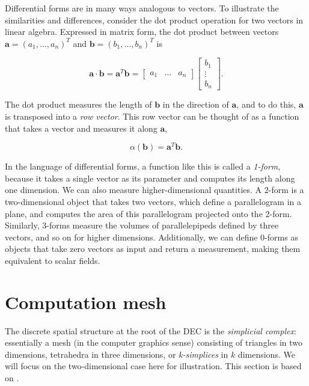\documentclass[utf8,english]{gradu3}
\begin{document}
Differential forms are in many ways analogous to vectors.
To illustrate the similarities and differences,
consider the dot product operation
for two vectors in linear algebra.
Expressed in matrix form, the dot product between vectors
$\mathbf{a} = (a_1, \dots, a_n)^T$ and $\mathbf{b} = (b_1, \dots, b_n)^T$
is

\[
  \mathbf{a} \cdot \mathbf{b} = \mathbf{a}^T \mathbf{b}
  = \begin{bmatrix}
    a_1 & \dots & a_n
  \end{bmatrix}
  \begin{bmatrix}
    b_1 \\ \vdots \\ b_n
  \end{bmatrix}.
\]

The dot product measures the length of $\mathbf{b}$ in the direction of $\mathbf{a}$,
and to do this, $\mathbf{a}$ is transposed into a \textit{row vector}.
This row vector can be thought of as a function
that takes a vector and measures it along $\mathbf{a}$,

\[
  \alpha(\mathbf{b}) = \mathbf{a}^T \mathbf{b}.
\]

In the language of differential forms,
a function like this is called a \textit{1-form},
because it takes a single vector as its parameter
and computes its length along one dimension.
We can also measure higher-dimensional quantities.
A 2-form is a two-dimensional object that takes two vectors,
which define a parallelogram in a plane,
and computes the area of this parallelogram
projected onto the 2-form.
Similarly, 3-forms measure the volumes of parallelepipeds
defined by three vectors, and so on for higher dimensions.
Additionally, we can define 0-forms
as objects that take zero vectors as input and return a measurement,
making them equivalent to scalar fields.


\section{Computation mesh}

The discrete spatial structure at the root of the DEC is the \textit{simplicial complex}:
essentially a mesh (in the computer graphics sense)
consisting of triangles in two dimensions,
tetrahedra in three dimensions, or \textit{k-simplices} in $k$ dimensions.
We will focus on the two-dimensional case here for illustration.
This section is based on \parencite{desbrun_discrete_2006}.
\end{document}
